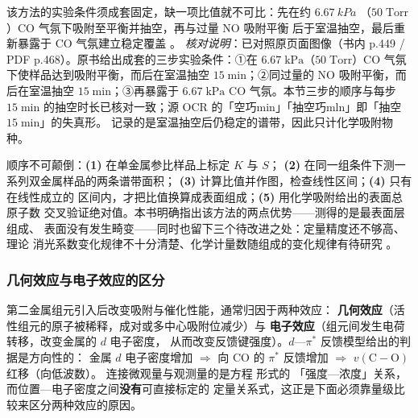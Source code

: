 \begin{measure}
该方法的实验条件须成套固定，缺一项比值就不可比：先在约 $\qty{6.67}{kPa}$
（$50\;\mathrm{Torr}$）CO 气氛下吸附至平衡并抽空，再与过量 NO 吸附平衡
后于室温抽空，最后重新暴露于 CO 气氛建立稳定覆盖
。
\emph{核对说明}：已对照原页面图像（书内 p.449 / PDF p.468）。原书给出成套的三步实验条件：①在 $6.67\;\mathrm{kPa}$（$50\;\mathrm{Torr}$）CO 气氛下使样品达到吸附平衡，而后在室温抽空 $15\;\mathrm{min}$；②同过量的 NO 吸附平衡，而后在室温抽空 $15\;\mathrm{min}$；③再暴露于 $6.67\;\mathrm{kPa}$ CO 气氛。本节三步的顺序与每步 $15\;\mathrm{min}$ 的抽空时长已核对一致；源 OCR 的「空巧min」「抽空巧mln」即「抽空 $15\;\mathrm{min}$」的失真形。
记录的是室温抽空后仍稳定的谱带，因此只计化学吸附物种。
\end{measure}

\begin{dataflow}
顺序不可颠倒：\textbf{(1)} 在单金属参比样品上标定 $K$ 与 $S$；
\textbf{(2)} 在同一组条件下测一系列双金属样品的两条谱带面积；
\textbf{(3)} 计算比值并作图，检查线性区间；\textbf{(4)} 只有在线性成立的
区间内，才把比值换算成表面组成；\textbf{(5)} 用化学吸附给出的表面总原子数
交叉验证绝对值。本书明确指出该方法的两点优势——测得的是最表面层组成、
表面没有发生畸变——同时也留下三个待改进之处：定量精度还不够高、理论
消光系数变化规律不十分清楚、化学计量数随组成的变化规律有待研究
。
\end{dataflow}

\subsubsection{几何效应与电子效应的区分}

\begin{principle}
第二金属组元引入后改变吸附与催化性能，通常归因于两种效应：
\textbf{几何效应}（活性组元的原子被稀释，成对或多中心吸附位减少）与
\textbf{电子效应}（组元间发生电荷转移，改变金属的 $d$ 电子密度，
从而改变反馈键强度）。$d$—$\pi^{*}$ 反馈模型给出的判据是方向性的：
金属 $d$ 电子密度增加 $\Rightarrow$ 向 CO 的 $\pi^{*}$ 反馈增加
$\Rightarrow$ $v(\mathrm{C{-}O})$ 红移（向低波数）。
连接微观量与观测量的是方程  形式的
「强度—浓度」关系，而位置—电子密度之间\textbf{没有}可直接标定的
定量关系式，这正是下面必须靠量级比较来区分两种效应的原因。
\end{principle}

